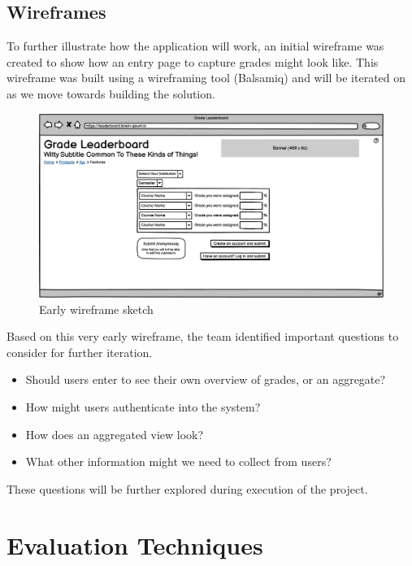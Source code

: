 \subsection{Wireframes}
To further illustrate how the application will work, an initial wireframe was created to show how an entry page to capture grades might look like. This wireframe was built using a wireframing tool (Balsamiq) and will be iterated on as we move towards building the solution.

\begin{figure}
    \centering
    \includegraphics[width=\textwidth]{images/initial_page.png}
    \caption{Early wireframe sketch}
    \label{fig:earlywireframe}
\end{figure}

Based on this very early wireframe, the team identified important questions to consider for further iteration.

\begin{itemize}
    \item Should users enter to see their own overview of grades, or an aggregate?
    \item How might users authenticate into the system?
    \item How does an aggregated view look?
    \item What other information might we need to collect from users?
\end{itemize}

These questions will be further explored during execution of the project.

\section{Evaluation Techniques}
